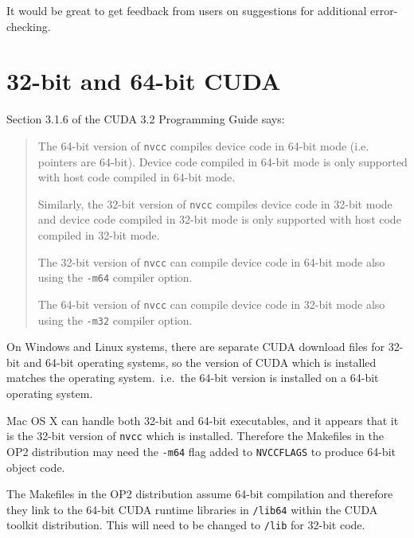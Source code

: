 \documentclass[11pt]{article}
\begin{document}
It would be great to get feedback from users on suggestions for
additional error-checking.


\newpage
\section{32-bit and 64-bit CUDA}

Section 3.1.6 of the CUDA 3.2 Programming Guide says:
\begin{quotation}
The 64-bit version of {\tt nvcc} compiles device code in 64-bit mode
(i.e. pointers are 64-bit). Device code compiled in 64-bit mode
is only supported with host code compiled in 64-bit mode.

Similarly, the 32-bit version of {\tt nvcc} compiles device code in
32-bit mode and device code compiled in 32-bit mode is only
supported with host code compiled in 32-bit mode.

The 32-bit version of {\tt nvcc} can compile device code in 64-bit mode
also using the {\tt -m64} compiler option.

The 64-bit version of {\tt nvcc} can compile device code in 32-bit mode
also using the {\tt -m32} compiler option.
\end{quotation}

On Windows and Linux systems, there are separate CUDA download files
for 32-bit and 64-bit operating systems, so the version of CUDA which
is installed matches the operating system.~i.e.~the 64-bit version is
installed on a 64-bit operating system.

Mac OS X can handle both 32-bit and 64-bit executables, and it appears
that it is the 32-bit version of {\tt nvcc} which is installed.  Therefore
the Makefiles in the OP2 distribution may need the {\tt -m64} flag
added to {\tt NVCCFLAGS} to produce 64-bit object code.

The Makefiles in the OP2 distribution assume 64-bit compilation and
therefore they link to the 64-bit CUDA runtime libraries in {\tt /lib64}
within the CUDA toolkit distribution.  This will need to be changed to
{\tt /lib} for 32-bit code.


\newpage
\end{document}
